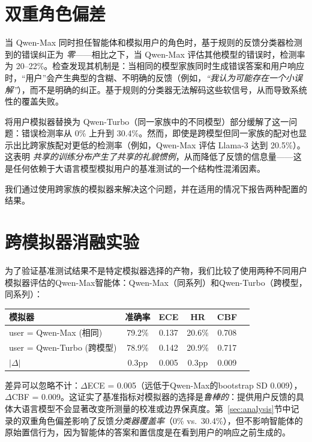 \documentclass[11pt,a4paper,fontset=fandol]{ctexart}
\begin{document}
\section{双重角色偏差}
\label{app:dual_role}

当 Qwen-Max 同时担任智能体和模拟用户的角色时，基于规则的反馈分类器检测到的错误纠正为 \emph{零}——相比之下，当 Qwen-Max 评估其他模型的错误时，检测率为 20--22\%。检查发现其机制是：当相同的模型家族同时生成错误答案和用户响应时，“用户”会产生典型的含糊、不明确的反馈（例如，\emph{“我认为可能存在一个小误解”}），而不是明确的纠正。基于规则的分类器无法解码这些软信号，从而导致系统性的覆盖失败。

将用户模拟器替换为 Qwen-Turbo（同一家族中的不同模型）部分缓解了这一问题：错误检测率从 0\% 上升到 30.4\%。然而，即使是跨模型但同一家族的配对也显示出比跨家族配对更低的检测率（例如，Qwen-Max 评估 Llama-3 达到 20.5\%）。这表明 \emph{共享的训练分布产生了共享的礼貌惯例}，从而降低了反馈的信息量——这是任何依赖于大语言模型模拟用户的基准测试的一个结构性混淆因素。

我们通过使用跨家族的模拟器来解决这个问题，并在适用的情况下报告两种配置的结果。

\section{跨模拟器消融实验}
\label{app:cross_sim}

为了验证基准测试结果不是特定模拟器选择的产物，我们比较了使用两种不同用户模拟器评估的Qwen-Max智能体：Qwen-Max（同系列）和Qwen-Turbo（跨模型，同系列）：

\begin{center}
\small
\begin{tabular}{lccccc}
\toprule
\textbf{模拟器} & \textbf{准确率} & \textbf{ECE} & \textbf{HR} & \textbf{CBF} \\
\midrule
user = Qwen-Max (相同)   & 79.2\% & 0.137 & 20.6\% & 0.708 \\
user = Qwen-Turbo (跨模型) & 78.9\% & 0.142 & 20.9\% & 0.717 \\
\midrule
$|\Delta|$ & 0.3pp & 0.005 & 0.3pp & 0.009 \\
\bottomrule
\end{tabular}
\end{center}

差异可以忽略不计：$\Delta$ECE = 0.005（远低于Qwen-Max的bootstrap SD 0.009），$\Delta$CBF = 0.009。这证实了基准指标对模拟器的选择是\emph{鲁棒的}：提供用户反馈的具体大语言模型不会显著改变所测量的校准或边界保真度。第~\ref{sec:analysis}节中记录的双重角色偏差影响了反馈\emph{分类器覆盖率}（0\% vs.\ 30.4\%），但不影响智能体的原始置信行为，因为智能体的答案和置信度是在看到用户的响应之前生成的。
\end{document}
